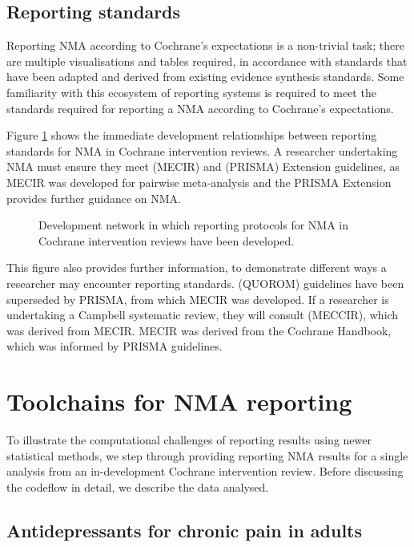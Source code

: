 \documentclass[AMA,STIX1COL]{WileyNJD-v2}\usepackage[]{graphicx}\usepackage[]{color}
\begin{document}
\subsection{Reporting standards}

Reporting NMA according to Cochrane's expectations is a non-trivial task; there are multiple visualisations and tables required, in accordance with standards that have been adapted and derived from existing evidence synthesis standards. Some familiarity with this ecosystem of reporting systems is required to meet the standards required for reporting a NMA according to Cochrane's expectations.

Figure \ref{fig:protocol} shows the immediate development relationships between reporting standards for NMA in Cochrane intervention reviews. A researcher undertaking NMA must ensure they meet (MECIR) and (PRISMA) Extension guidelines, as MECIR was developed for pairwise meta-analysis and the PRISMA Extension provides further guidance on NMA.

\begin{figure}
\centering

\caption{Development network in which reporting protocols for NMA in Cochrane intervention reviews have been developed.} \label{fig:protocol}
\end{figure}

This figure also provides further information, to demonstrate different ways a researcher may encounter reporting standards. (QUOROM) guidelines have been superseded by PRISMA, from which MECIR was developed. If a researcher is undertaking a Campbell systematic review, they will consult (MECCIR), which was derived from MECIR. MECIR was derived from the Cochrane Handbook, which was informed by PRISMA guidelines.

\section{Toolchains for NMA reporting}
\label{sec:toolchain}

To illustrate the computational challenges of reporting results using newer statistical methods, we step through providing reporting NMA results for a single analysis from an in-development Cochrane intervention review. Before discussing the codeflow in detail, we describe the data analysed.

\subsection{Antidepressants for chronic pain in adults}
\end{document}
